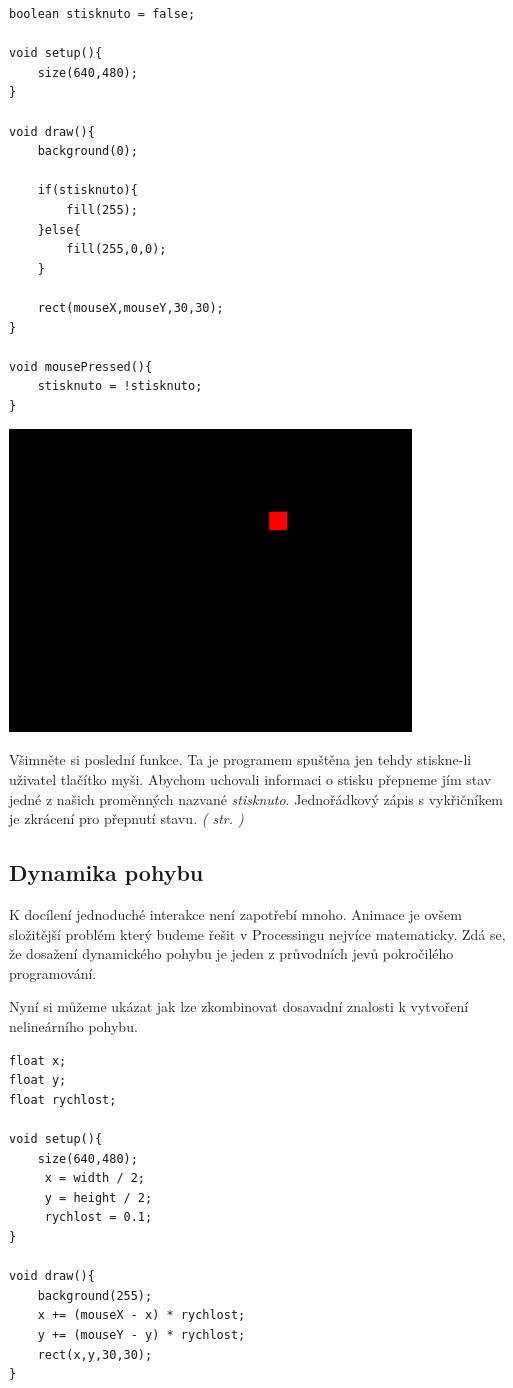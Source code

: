 \documentclass[10pt]{book}
\newcommand{\pododdil}[1]{\subsection{#1}\index{#1}\label{#1}}
\newcommand{\odkaz}[1]{\textit{(\nameref{#1} str. \pageref*{#1})}}
\begin{document}
\begin{lstlisting}
boolean stisknuto = false;

void setup(){
	size(640,480);
}

void draw(){
	background(0);
	
	if(stisknuto){
		fill(255);
	}else{
		fill(255,0,0);
	}
	
	rect(mouseX,mouseY,30,30);
}

void mousePressed(){
	stisknuto = !stisknuto;
}

\end{lstlisting}


\begin{center}
\includegraphics[width = 0.8\textwidth]{imgs/interakce-2.png}
\end{center}

Všimněte si poslední funkce. Ta je programem spuštěna jen tehdy stiskne-li uživatel tlačítko myši. Abychom uchovali informaci o stisku přepneme jím stav jedné z našich proměnných nazvané {\em stisknuto}. Jednořádkový zápis s vykřičníkem je zkrácení pro přepnutí stavu. \odkaz{Podmínka}


\pododdil{Dynamika pohybu}

K docílení jednoduché interakce není zapotřebí mnoho. Animace je ovšem složitější problém který budeme řešit v Processingu nejvíce matematicky. Zdá se, že dosažení dynamického pohybu je jeden z průvodních jevů pokročilého programování.

 Nyní si můžeme ukázat jak lze zkombinovat dosavadní znalosti k vytvoření nelineárního pohybu.
 
 \begin{lstlisting}
float x;
float y;
float rychlost;

void setup(){
	size(640,480);
     x = width / 2;
     y = height / 2;
     rychlost = 0.1;
}

void draw(){
	background(255);
	x += (mouseX - x) * rychlost;
	y += (mouseY - y) * rychlost;
	rect(x,y,30,30);
}
\end{lstlisting}
\end{document}
